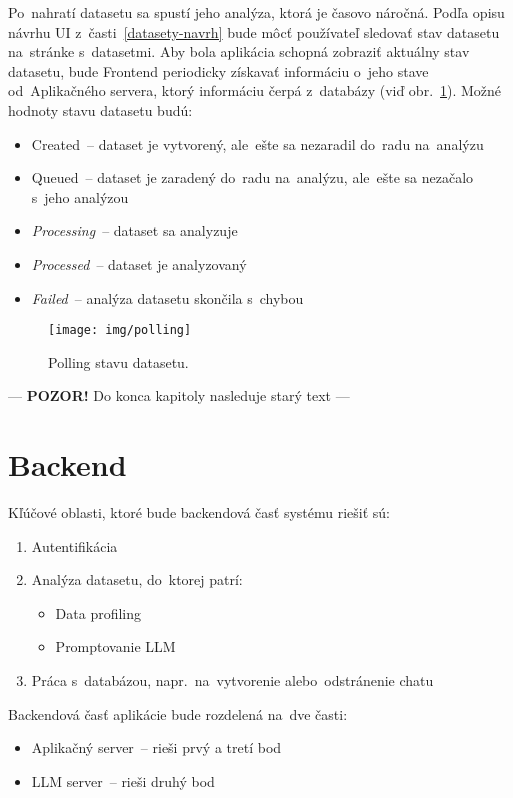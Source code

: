 Po~nahratí datasetu sa spustí jeho analýza, ktorá je časovo náročná. Podľa opisu návrhu UI z~časti~\ref{datasety-navrh} bude môcť používateľ sledovať stav datasetu na~stránke s~datasetmi. Aby bola aplikácia schopná zobraziť aktuálny stav datasetu, bude Frontend periodicky získavať informáciu o~jeho stave od~Aplikačného servera, ktorý informáciu čerpá z~databázy (viď obr.~\ref{polling}). Možné hodnoty stavu datasetu budú:
\begin{itemize}
\item Created~-- dataset je vytvorený, ale~ešte sa nezaradil do~radu na~analýzu
\item Queued~-- dataset je zaradený do~radu na~analýzu, ale~ešte sa nezačalo s~jeho analýzou
\item \textit{Processing}~-- dataset sa analyzuje
\item \textit{Processed}~-- dataset je analyzovaný
\item \textit{Failed}~-- analýza datasetu skončila s~chybou
\end{itemize}

\begin{figure}[H]\centering
\texttt{[image: img/polling]}
\caption{Polling stavu datasetu.}
\label{polling}
\end{figure}



--- \textbf{POZOR!} Do konca kapitoly nasleduje starý text ---



\section{Backend}

Kľúčové oblasti, ktoré bude backendová časť systému riešiť sú:
\begin{enumerate}
\item Autentifikácia
\item Analýza datasetu, do~ktorej patrí:
\begin{itemize}
\item Data profiling
\item Promptovanie LLM
\end{itemize}
\item Práca s~databázou, napr.~na~vytvorenie alebo~odstránenie chatu
\end{enumerate}

Backendová časť aplikácie bude rozdelená na~dve časti:
\begin{itemize}
\item Aplikačný server~-- rieši prvý a tretí bod
\item LLM server~-- rieši druhý bod
\end{itemize}

